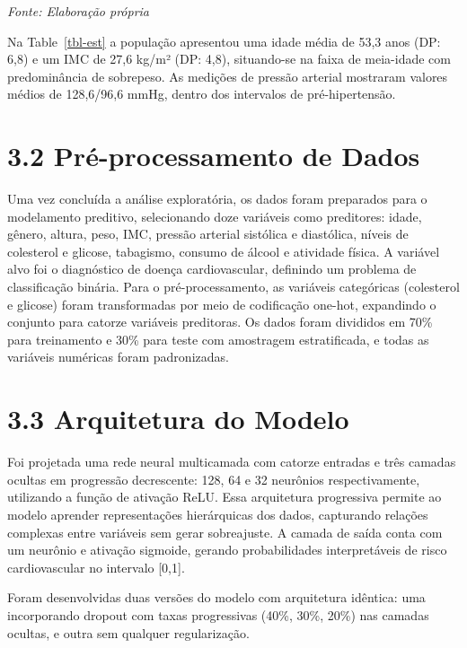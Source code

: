 \documentclass[
  oneclumn]{article}
\begin{document}
\begin{center}
\footnotesize \textit{Fonte: Elaboração própria}
\end{center}

Na Table~\ref{tbl-est} a população apresentou uma idade média de 53,3
anos (DP: 6,8) e um IMC de 27,6 kg/m² (DP: 4,8), situando-se na faixa de
meia-idade com predominância de sobrepeso. As medições de pressão
arterial mostraram valores médios de 128,6/96,6 mmHg, dentro dos
intervalos de pré-hipertensão.

\section{3.2 Pré-processamento de
Dados}\label{pruxe9-processamento-de-dados}

Uma vez concluída a análise exploratória, os dados foram preparados para
o modelamento preditivo, selecionando doze variáveis como preditores:
idade, gênero, altura, peso, IMC, pressão arterial sistólica e
diastólica, níveis de colesterol e glicose, tabagismo, consumo de álcool
e atividade física. A variável alvo foi o diagnóstico de doença
cardiovascular, definindo um problema de classificação binária. Para o
pré-processamento, as variáveis categóricas (colesterol e glicose) foram
transformadas por meio de codificação one-hot, expandindo o conjunto
para catorze variáveis preditoras. Os dados foram divididos em 70\% para
treinamento e 30\% para teste com amostragem estratificada, e todas as
variáveis numéricas foram padronizadas.

\section{3.3 Arquitetura do Modelo}\label{arquitetura-do-modelo}

Foi projetada uma rede neural multicamada com catorze entradas e três
camadas ocultas em progressão decrescente: 128, 64 e 32 neurônios
respectivamente, utilizando a função de ativação ReLU. Essa arquitetura
progressiva permite ao modelo aprender representações hierárquicas dos
dados, capturando relações complexas entre variáveis sem gerar
sobreajuste. A camada de saída conta com um neurônio e ativação
sigmoide, gerando probabilidades interpretáveis de risco cardiovascular
no intervalo {[}0,1{]}.

Foram desenvolvidas duas versões do modelo com arquitetura idêntica: uma
incorporando dropout com taxas progressivas (40\%, 30\%, 20\%) nas
camadas ocultas, e outra sem qualquer regularização.
\end{document}
